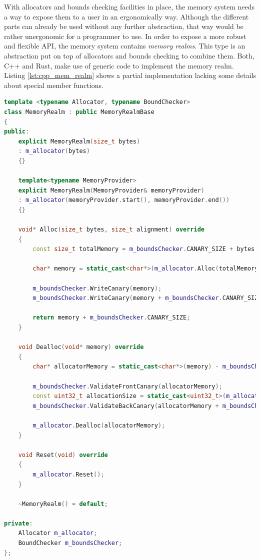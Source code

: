 With allocators and bounds checking facilities in place, the memory system needs a way to expose them to a user in an ergonomically way. Although the different parts can already be used without any further abstraction, that way would be rather unergonomic for a programmer to use. In order to expose a more robust and flexible \ac{API}, the memory system contains \textit{memory realms}. This type is an abstraction put on top of allocators and bounds checking to combine them. Both, C++ and Rust, make use of generic code to implement the memory realm. Listing \ref{lst:cpp_mem_realm} shows a partial implementation lacking some details about special member functions. \\

\begin{lstlisting}[caption={Implementation of the memory realm in C++. Some implementation deatils were omitted.)}, label={lst:cpp_mem_realm}, language={C++}]
template <typename Allocator, typename BoundChecker>
class MemoryRealm : public MemoryRealmBase
{
public:
	explicit MemoryRealm(size_t bytes)
	: m_allocator(bytes)
	{}
	
	template<typename MemoryProvider>
	explicit MemoryRealm(MemoryProvider& memoryProvider)
	: m_allocator(memoryProvider.start(), memoryProvider.end())
	{}
	
	void* Alloc(size_t bytes, size_t alignment) override
	{
		const size_t totalMemory = m_boundsChecker.CANARY_SIZE + bytes + m_boundsChecker.CANARY_SIZE;
		
		char* memory = static_cast<char*>(m_allocator.Alloc(totalMemory, alignment, m_boundsChecker.CANARY_SIZE));
		
		m_boundsChecker.WriteCanary(memory);
		m_boundsChecker.WriteCanary(memory + m_boundsChecker.CANARY_SIZE + bytes);
		
		return memory + m_boundsChecker.CANARY_SIZE;
	}
	
	void Dealloc(void* memory) override
	{
		char* allocatorMemory = static_cast<char*>(memory) - m_boundsChecker.CANARY_SIZE;
		
		m_boundsChecker.ValidateFrontCanary(allocatorMemory);
		const uint32_t allocationSize = static_cast<uint32_t>(m_allocator.GetAllocationSize(allocatorMemory));
		m_boundsChecker.ValidateBackCanary(allocatorMemory + m_boundsChecker.CANARY_SIZE + allocationSize);
		
		m_allocator.Dealloc(allocatorMemory);
	}
	
	void Reset(void) override
	{
		m_allocator.Reset();
	}
	
	~MemoryRealm() = default;

private:
	Allocator m_allocator;
	BoundChecker m_boundsChecker;
};
\end{lstlisting}

